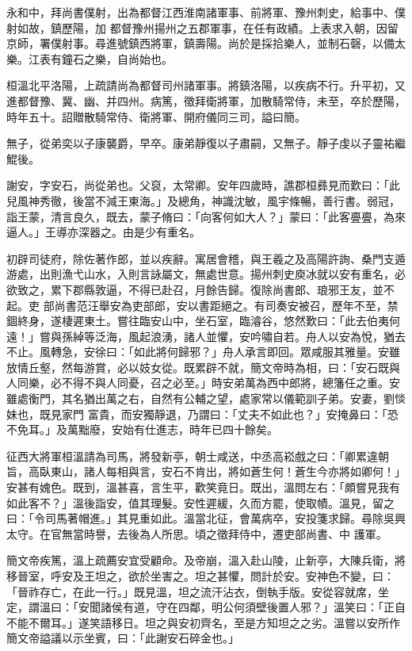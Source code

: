 \begin{pinyinscope}
 永和中，拜尚書僕射，出為都督江西淮南諸軍事、前將軍、豫州刺史，給事中、僕射如故，鎮歷陽，加
 都督豫州揚州之五郡軍事，在任有政績。上表求入朝，因留京師，署僕射事。尋進號鎮西將軍，鎮壽陽。尚於是採拾樂人，並制石磬，以備太樂。江表有鐘石之樂，自尚始也。



 桓溫北平洛陽，上疏請尚為都督司州諸軍事。將鎮洛陽，以疾病不行。升平初，又進都督豫、冀、幽、并四州。病篤，徵拜衛將軍，加散騎常侍，未至，卒於歷陽，時年五十。詔贈散騎常侍、衛將軍、開府儀同三司，謚曰簡。



 無子，從弟奕以子康襲爵，早卒。康弟靜復以子肅嗣，又無子。靜子虔以子靈祐繼鯤後。



 謝安，字安石，尚從弟也。父裒，太常卿。安年四歲時，譙郡桓彞見而歎曰：「此兒風神秀徹，後當不減王東海。」及總角，神識沈敏，風宇條暢，善行書。弱冠，詣王蒙，清言良久，既去，蒙子脩曰：「向客何如大人？」蒙曰：「此客亹亹，為來逼人。」王導亦深器之。由是少有重名。



 初辟司徒府，除佐著作郎，並以疾辭。寓居會稽，與王羲之及高陽許詢、桑門支遁游處，出則漁弋山水，入則言詠屬文，無處世意。揚州刺史庾冰就以安有重名，必欲致之，累下郡縣敦逼，不得已赴召，月餘告歸。復除尚書郎、琅邪王友，並不起。吏
 部尚書范汪舉安為吏部郎，安以書距絕之。有司奏安被召，歷年不至，禁錮終身，遂棲遲東土。嘗往臨安山中，坐石室，臨濬谷，悠然歎曰：「此去伯夷何遠！」嘗與孫綽等泛海，風起浪湧，諸人並懼，安吟嘯自若。舟人以安為悅，猶去不止。風轉急，安徐曰：「如此將何歸邪？」舟人承言即回。眾咸服其雅量。安雖放情丘壑，然每游賞，必以妓女從。既累辟不就，簡文帝時為相，曰：「安石既與人同樂，必不得不與人同憂，召之必至。」時安弟萬為西中郎將，總籓任之重。安雖處衡門，其名猶出萬之右，自然有公輔之望，處家常以儀範訓子弟。安妻，劉惔妹也，既見家門
 富貴，而安獨靜退，乃謂曰：「丈夫不如此也？」安掩鼻曰：「恐不免耳。」及萬黜廢，安始有仕進志，時年已四十餘矣。



 征西大將軍桓溫請為司馬，將發新亭，朝士咸送，中丞高崧戲之曰：「卿累違朝旨，高臥東山，諸人每相與言，安石不肯出，將如蒼生何！蒼生今亦將如卿何！」安甚有媿色。既到，溫甚喜，言生平，歡笑竟日。既出，溫問左右：「頗嘗見我有如此客不？」溫後詣安，值其理髮。安性遲緩，久而方罷，使取幘。溫見，留之曰：「令司馬著帽進。」其見重如此。溫當北征，會萬病卒，安投箋求歸。尋除吳興太守。在官無當時譽，去後為人所思。頃之徵拜侍中，遷吏部尚書、中
 護軍。



 簡文帝疾篤，溫上疏薦安宜受顧命。及帝崩，溫入赴山陵，止新亭，大陳兵衛，將移晉室，呼安及王坦之，欲於坐害之。坦之甚懼，問計於安。安神色不變，曰：「晉祚存亡，在此一行。」既見溫，坦之流汗沾衣，倒執手版。安從容就席，坐定，謂溫曰：「安聞諸侯有道，守在四鄰，明公何須壁後置人邪？」溫笑曰：「正自不能不爾耳。」遂笑語移日。坦之與安初齊名，至是方知坦之之劣。溫嘗以安所作簡文帝謚議以示坐賓，曰：「此謝安石碎金也。」




\end{pinyinscope}

